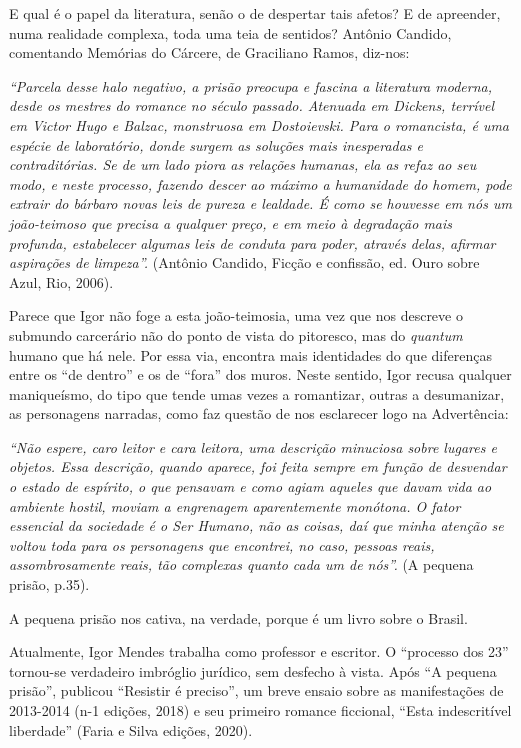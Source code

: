 \documentclass[11pt]{extarticle}
\begin{document}
E qual é o papel da literatura, senão o de despertar tais afetos? E de
apreender, numa realidade complexa, toda uma teia de sentidos? Antônio
Candido, comentando Memórias do Cárcere, de Graciliano Ramos, diz-nos:

\emph{``Parcela desse halo negativo, a prisão preocupa e fascina a
literatura moderna, desde os mestres do romance no século passado.
Atenuada em Dickens, terrível em Victor Hugo e Balzac, monstruosa em
Dostoievski. Para o romancista, é uma espécie de laboratório, donde
surgem as soluções mais inesperadas e contraditórias. Se de um lado
piora as relações humanas, ela as refaz ao seu modo, e neste processo,
fazendo descer ao máximo a humanidade do homem, pode extrair do bárbaro
novas leis de pureza e lealdade. É como se houvesse em nós um
joão-teimoso que precisa a qualquer preço, e em meio à degradação mais
profunda, estabelecer algumas leis de conduta para poder, através delas,
afirmar aspirações de limpeza''.} (Antônio Candido, Ficção e confissão,
ed. Ouro sobre Azul, Rio, 2006).

Parece que Igor não foge a esta joão-teimosia, uma vez que nos descreve
o submundo carcerário não do ponto de vista do pitoresco, mas do
\emph{quantum} humano que há nele. Por essa via, encontra mais
identidades do que diferenças entre os ``de dentro'' e os de ``fora''
dos muros. Neste sentido, Igor recusa qualquer maniqueísmo, do tipo que
tende umas vezes a romantizar, outras a desumanizar, as personagens
narradas, como faz questão de nos esclarecer logo na Advertência:

\emph{``Não espere, caro leitor e cara leitora, uma descrição minuciosa
sobre lugares e objetos. Essa descrição, quando aparece, foi feita
sempre em função de desvendar o estado de espírito, o que pensavam e
como agiam aqueles que davam vida ao ambiente hostil, moviam a
engrenagem aparentemente monótona. O fator essencial da sociedade é o
Ser Humano, não as coisas, daí que minha atenção se voltou toda para os
personagens que encontrei, no caso, pessoas reais, assombrosamente
reais, tão complexas quanto cada um de nós''.} (A pequena prisão, p.35).

A pequena prisão nos cativa, na verdade, porque é um livro sobre o
Brasil.

Atualmente, Igor Mendes trabalha como professor e escritor. O ``processo
dos 23'' tornou-se verdadeiro imbróglio jurídico, sem desfecho à vista.
Após ``A pequena prisão'', publicou ``Resistir é preciso'', um breve
ensaio sobre as manifestações de 2013-2014 (n-1 edições, 2018) e seu
primeiro romance ficcional, ``Esta indescritível liberdade'' (Faria e
Silva edições, 2020).
\end{document}
